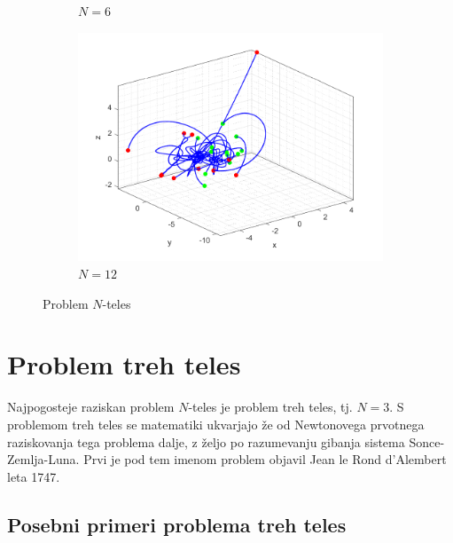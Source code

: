 \documentclass[a4paper,12pt]{article}
\begin{document}
\begin{figure}[H]
\begin{subfigure}[b]{0.6\textwidth}
        \caption{$N=6$}
        \label{fig:three sin x}
    \end{subfigure}
    \hfill
    \begin{subfigure}[b]{0.6\textwidth}
        \centering
        \includegraphics[width=\textwidth]{figures/12body.png}
        \caption{$N=12$}
        \label{12}
    \end{subfigure}
       \caption{Problem $N$-teles}
       \label{Nbody}
\end{figure}



\section{Problem treh teles}

Najpogosteje raziskan problem $N$-teles je problem treh teles, tj. $N=3$.
S problemom treh teles se matematiki ukvarjajo že od Newtonovega prvotnega raziskovanja tega problema dalje,
z željo po razumevanju gibanja sistema Sonce-Zemlja-Luna.
Prvi je pod tem imenom problem objavil Jean le Rond d'Alembert leta 1747.

\subsection{Posebni primeri problema treh teles}
\end{document}
